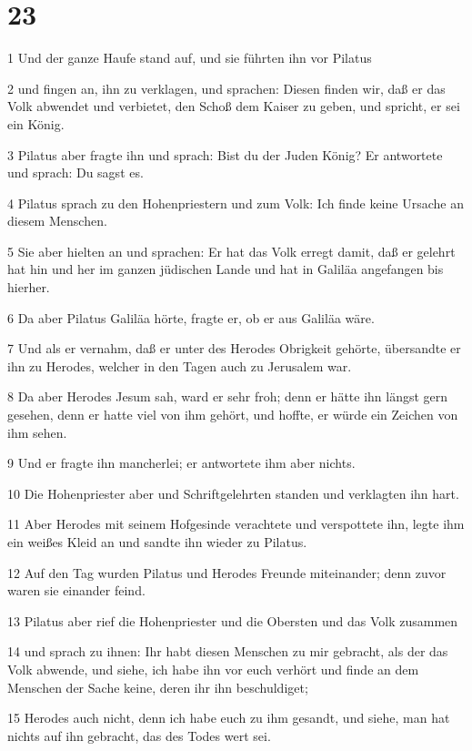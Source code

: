 \chapter{23}

\par 1 Und der ganze Haufe stand auf, und sie führten ihn vor Pilatus
\par 2 und fingen an, ihn zu verklagen, und sprachen: Diesen finden wir, daß er das Volk abwendet und verbietet, den Schoß dem Kaiser zu geben, und spricht, er sei ein König.
\par 3 Pilatus aber fragte ihn und sprach: Bist du der Juden König? Er antwortete und sprach: Du sagst es.
\par 4 Pilatus sprach zu den Hohenpriestern und zum Volk: Ich finde keine Ursache an diesem Menschen.
\par 5 Sie aber hielten an und sprachen: Er hat das Volk erregt damit, daß er gelehrt hat hin und her im ganzen jüdischen Lande und hat in Galiläa angefangen bis hierher.
\par 6 Da aber Pilatus Galiläa hörte, fragte er, ob er aus Galiläa wäre.
\par 7 Und als er vernahm, daß er unter des Herodes Obrigkeit gehörte, übersandte er ihn zu Herodes, welcher in den Tagen auch zu Jerusalem war.
\par 8 Da aber Herodes Jesum sah, ward er sehr froh; denn er hätte ihn längst gern gesehen, denn er hatte viel von ihm gehört, und hoffte, er würde ein Zeichen von ihm sehen.
\par 9 Und er fragte ihn mancherlei; er antwortete ihm aber nichts.
\par 10 Die Hohenpriester aber und Schriftgelehrten standen und verklagten ihn hart.
\par 11 Aber Herodes mit seinem Hofgesinde verachtete und verspottete ihn, legte ihm ein weißes Kleid an und sandte ihn wieder zu Pilatus.
\par 12 Auf den Tag wurden Pilatus und Herodes Freunde miteinander; denn zuvor waren sie einander feind.
\par 13 Pilatus aber rief die Hohenpriester und die Obersten und das Volk zusammen
\par 14 und sprach zu ihnen: Ihr habt diesen Menschen zu mir gebracht, als der das Volk abwende, und siehe, ich habe ihn vor euch verhört und finde an dem Menschen der Sache keine, deren ihr ihn beschuldiget;
\par 15 Herodes auch nicht, denn ich habe euch zu ihm gesandt, und siehe, man hat nichts auf ihn gebracht, das des Todes wert sei.
